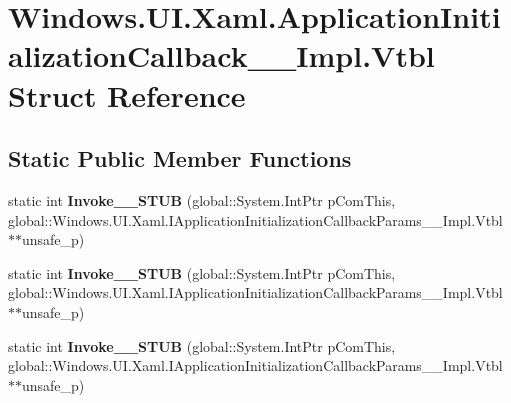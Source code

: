 \hypertarget{struct_windows_1_1_u_i_1_1_xaml_1_1_application_initialization_callback_____impl_1_1_vtbl}{}\section{Windows.\+U\+I.\+Xaml.\+Application\+Initialization\+Callback\+\_\+\+\_\+\+Impl.\+Vtbl Struct Reference}
\label{struct_windows_1_1_u_i_1_1_xaml_1_1_application_initialization_callback_____impl_1_1_vtbl}
\subsection*{Static Public Member Functions}
\begin{DoxyCompactItemize}
\item 
\mbox{\label{struct_windows_1_1_u_i_1_1_xaml_1_1_application_initialization_callback_____impl_1_1_vtbl_a996b5b86a0ef2022da95e147a5de12af}} 
static int {\bfseries Invoke\+\_\+\+\_\+\+S\+T\+UB} (global\+::\+System.\+Int\+Ptr p\+Com\+This, global\+::\+Windows.\+U\+I.\+Xaml.\+I\+Application\+Initialization\+Callback\+Params\+\_\+\+\_\+\+Impl.\+Vtbl $\ast$$\ast$unsafe\+\_\+p)
\item 
\mbox{\label{struct_windows_1_1_u_i_1_1_xaml_1_1_application_initialization_callback_____impl_1_1_vtbl_a996b5b86a0ef2022da95e147a5de12af}} 
static int {\bfseries Invoke\+\_\+\+\_\+\+S\+T\+UB} (global\+::\+System.\+Int\+Ptr p\+Com\+This, global\+::\+Windows.\+U\+I.\+Xaml.\+I\+Application\+Initialization\+Callback\+Params\+\_\+\+\_\+\+Impl.\+Vtbl $\ast$$\ast$unsafe\+\_\+p)
\item 
\mbox{\label{struct_windows_1_1_u_i_1_1_xaml_1_1_application_initialization_callback_____impl_1_1_vtbl_a996b5b86a0ef2022da95e147a5de12af}} 
static int {\bfseries Invoke\+\_\+\+\_\+\+S\+T\+UB} (global\+::\+System.\+Int\+Ptr p\+Com\+This, global\+::\+Windows.\+U\+I.\+Xaml.\+I\+Application\+Initialization\+Callback\+Params\+\_\+\+\_\+\+Impl.\+Vtbl $\ast$$\ast$unsafe\+\_\+p)
$$
\end{DoxyCompactItemize}
